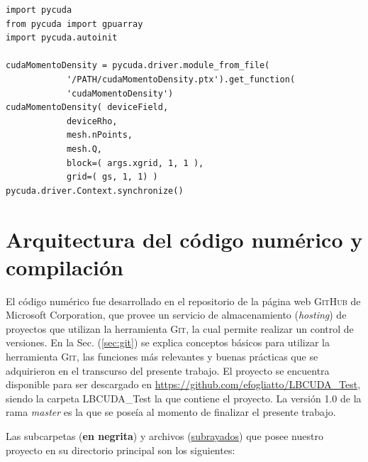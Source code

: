 {\footnotesize
	\begin{frame}{}
		\begin{lstlisting}[frame=single]
import pycuda
from pycuda import gpuarray
import pycuda.autoinit
		
cudaMomentoDensity = pycuda.driver.module_from_file(
			'/PATH/cudaMomentoDensity.ptx').get_function(
			'cudaMomentoDensity')					
cudaMomentoDensity(	deviceField,
			deviceRho,
			mesh.nPoints,
			mesh.Q,
			block=( args.xgrid, 1, 1 ),
			grid=( gs, 1, 1) )     			    
pycuda.driver.Context.synchronize()
		\end{lstlisting}
		
	\end{frame}
}




	   

\section{Arquitectura del código numérico y compilación}

El código numérico fue desarrollado en el repositorio de la página web \textsc{GitHub} de Microsoft Corporation, que provee un servicio de almacenamiento (\textit{hosting}) de proyectos que utilizan la herramienta \textsc{Git}, la cual permite realizar un control de versiones. En la Sec. (\ref{sec:git}) se explica conceptos básicos para utilizar la herramienta \textsc{Git}, las funciones más relevantes y buenas prácticas que se adquirieron en el transcurso del presente trabajo. El proyecto se encuentra disponible para ser descargado en \url{https://github.com/efogliatto/LBCUDA_Test}, siendo la carpeta LBCUDA\_Test la que contiene el proyecto. La versión 1.0 de la rama \textit{master} es la que se poseía al momento de finalizar el presente trabajo.

Las subcarpetas (\textbf{en negrita}) y archivos (\underline{subrayados}) que posee nuestro proyecto en su directorio principal son los siguientes:

